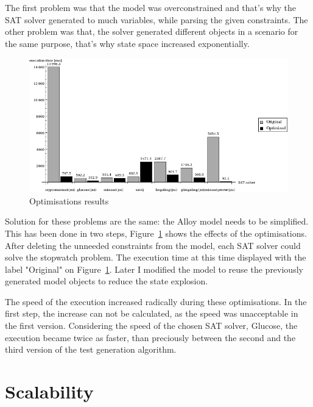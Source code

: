 The first problem was that the model was overconstrained and that's why the SAT solver generated to much variables, while parsing the given constraints. The other problem was that, the solver generated different objects in a scenario for the same purpose, that's why state space increased exponentially.

\begin{figure}[htp]
\centering
\includegraphics[scale=0.55]{figures/measurements_optimalizations}
\caption{Optimisations results}
\label{fig:measurements_optimalizations}
\end{figure}

Solution for these problems are the same: the Alloy model needs to be simplified. This has been done in two steps,  Figure~\ref{fig:measurements_optimalizations} shows the effects of the optimisations. After deleting the unneeded constraints from the model, each SAT solver could solve the stopwatch problem. The execution time at this time displayed with the label "Original" on Figure~\ref{fig:measurements_optimalizations}. Later I modified the model to reuse the previously generated model objects to reduce the state explosion.

The speed of the execution increased radically during these optimisations. In the first step, the increase can not be calculated, as the speed was unacceptable in the first version. Considering the speed of the chosen SAT solver, Glucose, the execution became twice as faster, than preciously between the second and the third version of the test generation algorithm.


\section{Scalability}
\label{sec:scalability}

